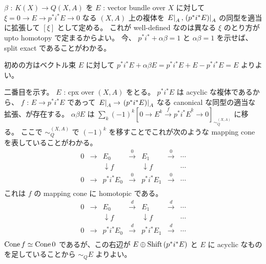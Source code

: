 \documentclass[dvipdfmx]{jsarticle}
\begin{document}
\begin{Proof}[A.3]
\itemprof
  \(\beta\) : \(K(X) \to Q(X,A)\) を \(E\) : vector bundle over \(X\) に対して \(\xi = 0 \to E \to p^*i^* E \to 0\) なる \((X,A)\) 上の複体を \(\left. {E} \right| _{A} , \left. {(p^*i^*E)} \right| _{A}\) の同型を適当に拡張して \([\xi]\) として定める。
  これが well-defined なのは異なる \(\xi\) のとり方が upto homotopy で定まるからよい。
  今、 \(p^* i^* + \alpha \beta = 1\) と \(\alpha \beta = 1\) を示せば、 split exact であることがわかる。

  初めの方はベクトル束 \(E\) に対して \(p^* i^* E + \alpha \beta E = p^* i^* E + E - p^* i^* E = E\) よりよい。

  二番目を示す。
  \(E\) : cpx over \((X,A)\) をとる。
  \(p^*i^* E\) は acyclic な複体であるから、 \(f\) : \(E \to p^*i^* E\) であって \(\left. {E} \right| _{A} \to \left. {(p^*i^*E)} \right| _{A}\) なる canonical な同型の適当な拡張、が存在する。
  \(\alpha \beta E\) は \(\sum_{k} (-1)^{k} [0 \to E^k \overset{f}{\to} {p^*i^*E}^k \to 0]_{\sim_{Q}^{(X,A)}}\) に移る。
  ここで \(\sim_{Q}^{(X,A)}\) で \((-1)^k\) を移すことでこれが次のような mapping cone を表していることがわかる。
  \[
    \begin{matrix}
      0 & \to & E_0 & \overset{0}{\to} & E_1 & \overset{0}{\to} & \cdots \\
      & & \downarrow f & & \downarrow f & & \cdots \\
      0 & \to & p^*i^*E_0 & \overset{0}{\to} & p^*i^*E_1 & \overset{0}{\to} & \cdots \\
    \end{matrix}
  \]
  これは \(f\) の mapping cone に homotopic である。
  \[
    \begin{matrix}
      0 & \to & E_0 & \overset{d}{\to} & E_1 & \overset{d}{\to} & \cdots \\
      & & \downarrow f & & \downarrow f & & \cdots \\
      0 & \to & p^*i^*E_0 & \overset{d}{\to} & p^*i^*E_1 & \overset{d}{\to} & \cdots \\
    \end{matrix}
  \]
  \(\text{Cone} \, {f} \simeq \text{Cone} \, {0}\) であるが、この右辺が \(E \oplus \text{Shift} \, {(p^*i^*E)}\) と \(E\) に acyclic なものを足していることから \(\sim_{Q} E\) よりよい。
\end{Proof}

\begin{Proof}[A.4]
\itemprof

\end{Proof}
\end{document}
